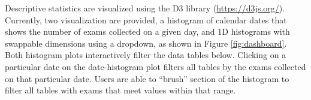 Descriptive statistics are visualized using the D3 library (\href{https://d3js.org/}{https://d3js.org/}). Currently, two visualization are provided, a histogram of calendar dates that shows the number of exams collected on a given day, and 1D histograms with swappable dimensions using a dropdown, as shown in Figure \ref{fig:dashboard}. Both histogram plots interactively filter the data tables below. Clicking on a particular date on the date-histogram plot filters all tables by the exams collected on that particular date. Users are able to ``brush'' section of the histogram to filter all tables with exams that meet values within that range.  